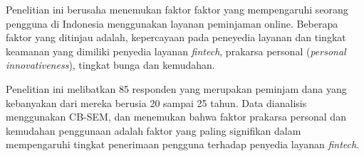 \documentclass{article}
\begin{document}






Penelitian ini berusaha menemukan faktor faktor 
yang mempengaruhi seorang pengguna di Indonesia menggunakan layanan peminjaman online. 
Beberapa faktor yang ditinjau adalah,
kepercayaan pada peneyedia layanan 
dan tingkat keamanan yang dimiliki penyedia layanan \emph{fintech}, 
prakarsa personal (\emph{personal innovativeness}), 
tingkat  bunga 
dan kemudahan.

Penelitian ini melibatkan 85 responden yang merupakan peminjam dana yang 
kebanyakan dari mereka berusia 20 sampai 25 tahun. 
Data dianalisis menggunakan CB-SEM, 
dan menemukan bahwa  
faktor prakarsa personal dan kemudahan penggunaan 
adalah faktor yang paling signifikan dalam mempengaruhi 
tingkat penerimaan pengguna terhadap penyedia layanan \emph{fintech}.
\end{document}
